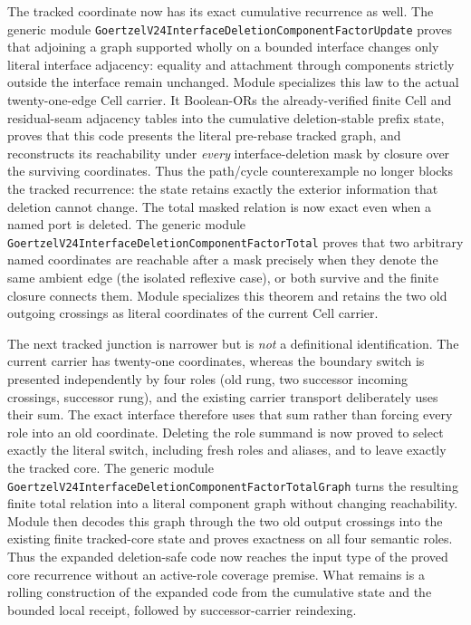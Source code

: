 \documentclass[11pt]{article}
\theoremstyle{definition}
\begin{document}
The tracked coordinate now has its exact cumulative recurrence as well.  The
generic module \texttt{GoertzelV24InterfaceDeletionComponentFactorUpdate}
proves that adjoining a graph supported wholly on a bounded interface changes
only literal interface adjacency: equality and attachment through components
strictly outside the interface remain unchanged.  Module
specializes this law to the actual twenty-one-edge Cell carrier.  It Boolean-ORs
the already-verified finite Cell and residual-seam adjacency tables into the
cumulative deletion-stable prefix state, proves that this code presents the
literal pre-rebase tracked graph, and reconstructs its reachability under
\emph{every} interface-deletion mask by closure over the surviving coordinates.
Thus the path/cycle counterexample no longer blocks the tracked recurrence: the
state retains exactly the exterior information that deletion cannot change.
The total masked relation is now exact even when a named port is deleted.
The generic module
\texttt{GoertzelV24InterfaceDeletionComponentFactorTotal} proves that two
arbitrary named coordinates are reachable after a mask precisely when they
denote the same ambient edge (the isolated reflexive case), or both survive
and the finite closure connects them.  Module
specializes this theorem and retains the two old outgoing crossings as literal
coordinates of the current Cell carrier.

The next tracked junction is narrower but is \emph{not} a definitional
identification.  The current carrier has twenty-one coordinates, whereas the
boundary switch is presented independently by four roles (old rung, two
successor incoming crossings, successor rung), and the existing carrier
transport deliberately uses their sum.  The exact interface therefore uses
that sum rather than forcing every role into an old coordinate.  Deleting the
role summand is now proved to select exactly the literal switch, including
fresh roles and aliases, and to leave exactly the tracked core.  The generic
module \texttt{GoertzelV24InterfaceDeletionComponentFactorTotalGraph} turns
the resulting finite total relation into a literal component graph without
changing reachability.  Module
 then
decodes this graph through the two old output crossings into the existing
finite tracked-core state and proves exactness on all four semantic roles.
Thus the expanded deletion-safe code now reaches the input type of the proved
core recurrence without an active-role coverage premise.  What remains is a
rolling construction of the expanded code from the cumulative state and the
bounded local receipt, followed by successor-carrier reindexing.
\end{document}
